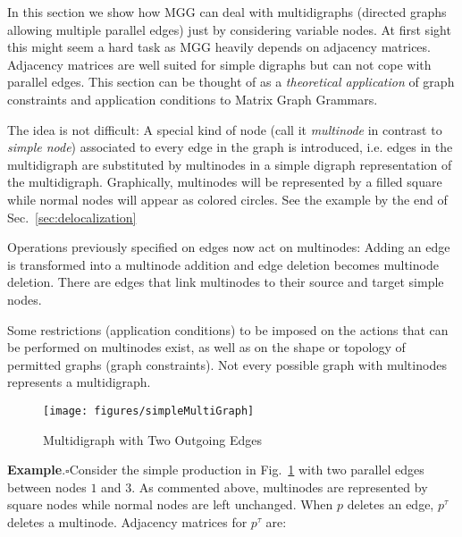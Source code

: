 \documentclass{fundam}
\begin{document}
In this section we show how MGG can deal with multidigraphs (directed
graphs allowing multiple parallel edges) just by considering variable
nodes. At first sight this might seem a hard task as MGG heavily
depends on adjacency matrices.  Adjacency matrices are well suited for
simple digraphs but can not cope with parallel edges. This section can
be thought of as a \emph{theoretical application} of graph constraints
and application conditions to Matrix Graph Grammars.

The idea is not difficult: A special kind of node (call it
\emph{multinode} in contrast to \emph{simple node}) associated to
every edge in the graph is introduced, i.e. edges in the multidigraph
are substituted by multinodes in a simple digraph representation of
the multidigraph.  Graphically, multinodes will be represented by a
filled square while normal nodes will appear as colored circles. See
the example by the end of Sec.~\ref{sec:delocalization}



Operations previously specified on edges now act on multinodes: Adding
an edge is transformed into a multinode addition and edge deletion
becomes multinode deletion.  There are edges that link multinodes to
their source and target simple nodes.

Some restrictions (application conditions) to be imposed on the
actions that can be performed on multinodes exist, as well as on the
shape or topology of permitted graphs (graph constraints). Not every
possible graph with multinodes represents a multidigraph.

\begin{figure}[htbp]
  \centering
  \texttt{[image: figures/simpleMultiGraph]}
  \caption{Multidigraph with Two Outgoing Edges}
  \label{fig:simpleMultiGraph}
\end{figure}

\noindent\textbf{Example}.$\square$Consider the simple production in
Fig.~\ref{fig:simpleMultiGraph} with two parallel edges between nodes
$1$ and $3$.  As commented above, multinodes are represented by square
nodes while normal nodes are left unchanged.  When $p$ deletes an
edge, $p^\tau$ deletes a multinode.  Adjacency matrices for $p^\tau$
are:
\end{document}
